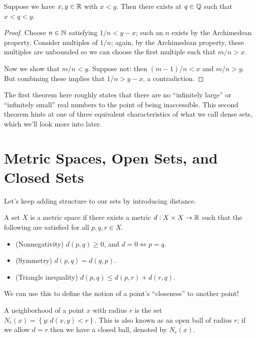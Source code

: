 \documentclass[../m131main.tex]{subfiles}
\begin{document}
\begin{theorem}[$\Q$ is dense in $\R$]
    Suppose we have $x,y \in \mathbb{R}$ with $x < y$. Then there exists at $q \in \mathbb{Q}$ such that $x < q < y$.
\end{theorem}

\begin{proof}
    Choose $n \in \mathbb{N}$ satisfying $1 / n < y - x$; such an $n$ exists by the Archimedean property.
    Consider multiples of $1 / n$; again, by the Archimedean property, these multiples are unbounded so we can choose the first multiple such that $m / n > x$.

    Now we show that $m / n < y$.
    Suppose not: then $(m-1) / n < x$ and $m / n > y$.
    But combining these implies that $1 / n > y - x$, a contradiction.
\end{proof}

The first theorem here roughly states that there are no ``infinitely large'' or ``infinitely small'' real numbers to the point of being inaccessible.
This second theorem hints at one of three equivalent characteristics of what we call dense sets, which we'll look more into later.

\section{Metric Spaces, Open Sets, and Closed Sets}
Let's keep adding structure to our sets by introducing distance.

\begin{definition}
    A set $X$ is a metric space if there exists a metric $d : X \times X \to \mathbb{R}$ such that the following are satisfied for all $p,q,r \in X$.
    \begin{itemize}
        \item (Nonnegativity) $d(p,q) \geq 0$, and $d = 0 \iff p = q$.
        \item (Symmetry) $d(p,q) = d(q,p)$.
        \item (Triangle inequality) $d(p,q) \leq d(p,r) + d(r,q)$.
    \end{itemize}
\end{definition}

We can use this to define the notion of a point's ``closeness'' to another point!

\begin{definition}[Neighborhood]
    A neighborhood of a point $x$ with radius $r$ is the set $N_r(x) = \left\{ y : d(x,y) < r \right\}$.
    This is also known as an open ball of radius $r$; if we allow $d = r$ then we have a closed ball, denoted by $\overline{N_r(x)}$.
\end{definition}
\end{document}
